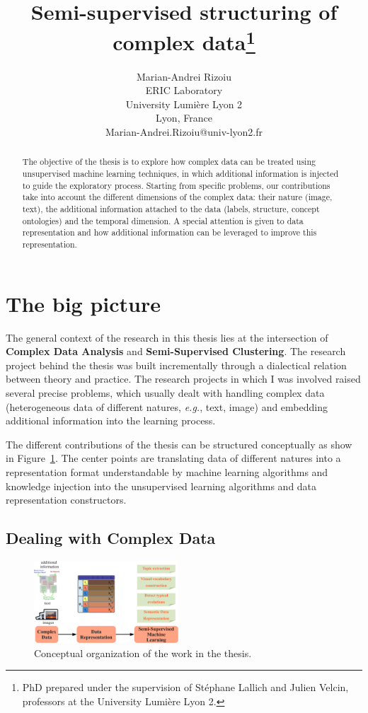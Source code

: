 \documentclass{article}
\title{Semi-supervised
structuring of complex data\thanks{PhD prepared under the supervision of St\'ephane Lallich and Julien Velcin, professors at the University Lumi\`ere Lyon 2.}}
\author{Marian-Andrei Rizoiu \\
ERIC Laboratory \\
University Lumi\`ere Lyon 2 \\
Lyon, France \\
Marian-Andrei.Rizoiu@univ-lyon2.fr}
\begin{document}
\maketitle

\begin{abstract}
The objective of the thesis is to explore how complex data can be treated using unsupervised machine learning techniques, in which additional information is injected to guide the exploratory process.
Starting from specific problems, our contributions take into account the different dimensions of the complex data: their nature (image, text), the additional information attached to the data (labels, structure, concept ontologies) and the temporal dimension.
A special attention is given to data representation and how additional information can be leveraged to improve this representation.
\end{abstract}

\section{The big picture}

The general context of the research in this thesis lies at the intersection of \textbf{Complex Data Analysis} and \textbf{Semi-Supervised Clustering}.
The research project behind the thesis was built incrementally through a dialectical relation between theory and practice.
The research projects in which I was involved raised several precise problems, which usually dealt with handling complex data (heterogeneous data of different natures, \textit{e.g.}, text, image) and embedding additional information into the learning process.

The different contributions of the thesis can be structured conceptually as show in Figure~\ref{fig:streamlined-schema}.
The center points are translating data of different natures into a representation format understandable by machine learning algorithms and knowledge injection into the unsupervised learning algorithms and data representation constructors.

\subsection{Dealing with Complex Data}
\label{subsec:complex-data}

\begin{figure}[!t]
	\centering
	\includegraphics[width=0.48\textwidth]{streamlined-schema}
	
	\caption{Conceptual organization of the work in the thesis.}
	\label{fig:streamlined-schema}
\end{figure}
\end{document}
